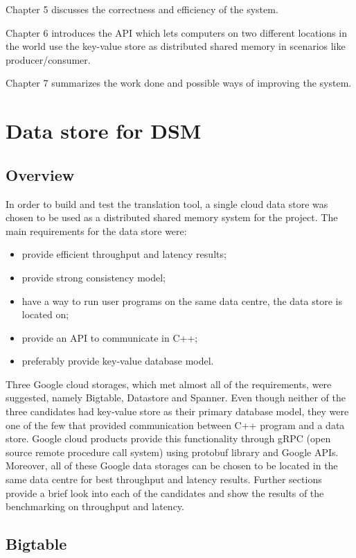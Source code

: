 \documentclass[bsc,frontabs,twoside,singlespacing,parskip,deptreport]{infthesis}     %
\begin{document}
Chapter 5 discusses the correctness and efficiency of the system. 

Chapter 6 introduces the API which lets computers on two different locations in the world use the key-value store as distributed shared memory in scenarios like producer/consumer.

Chapter 7 summarizes the work done and possible ways of improving the system.

\chapter{Data store for DSM}

\section{Overview}

In order to build and test the translation tool, a single cloud data store was chosen to be used as a distributed shared memory system for the project. The main requirements for the data store were:

\begin{itemize}
\item
provide efficient throughput and latency results;
\item
provide strong consistency model;
\item
have a way to run user programs on the same data centre, the data store is located on;
\item
provide an API to communicate in C++;
\item
preferably provide key-value database model.
\end{itemize}

Three Google cloud storages, which met almost all of the requirements, were suggested, namely Bigtable, Datastore and Spanner. Even though neither of the three candidates had key-value store as their primary database model, they were one of the few that provided communication between C++ program and a data store. Google cloud products provide this functionality through gRPC (open source remote procedure call system) using protobuf library and Google APIs. Moreover, all of these Google data storages can be chosen to be located in the same data centre for best throughput and latency results. Further sections provide a brief look into each of the candidates and show the results of the benchmarking on throughput and latency.

\section{Bigtable}
\end{document}
